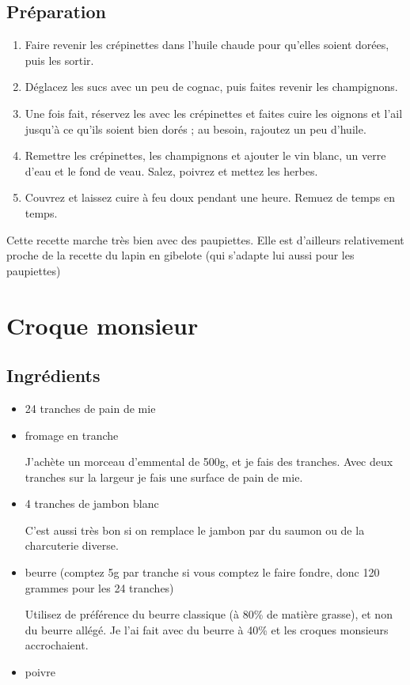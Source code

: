 \subsection*{Préparation}
\begin{enumerate}
\item Faire revenir les crépinettes dans l'huile chaude pour qu'elles soient dorées, puis les sortir.
\item Déglacez les sucs avec un peu de cognac, puis faites revenir les champignons.
\item Une fois fait, réservez les avec les crépinettes et faites cuire les oignons et l'ail jusqu'à ce qu'ils soient bien dorés ; au besoin, rajoutez un peu d'huile.
\item Remettre les crépinettes, les champignons et ajouter le vin blanc, un verre d'eau et le fond de veau. Salez, poivrez et mettez les herbes.
\item Couvrez et laissez cuire à feu doux pendant une heure. Remuez de temps en temps.
\end{enumerate}

\begin{remarque}
Cette recette marche très bien avec des paupiettes. Elle est d'ailleurs relativement proche de la recette du lapin en gibelote (qui s'adapte lui aussi pour les paupiettes)
\end{remarque}

\newpage
\section{Croque monsieur}
\subsection*{Ingrédients}
\begin{itemize}
\item 24 tranches de pain de mie
\item fromage en tranche
\begin{remarque}
J'achète un morceau d'emmental de 500g, et je fais des tranches. Avec deux tranches sur la largeur je fais une surface de pain de mie.
\end{remarque}

\item 4 tranches de jambon blanc
\begin{remarque}
C'est aussi très bon si on remplace le jambon par du saumon ou de la charcuterie diverse.
\end{remarque}

\item beurre (comptez 5g par tranche si vous comptez le faire fondre, donc 120 grammes pour les 24 tranches)
\begin{attention}
Utilisez de préférence du beurre classique (à 80\% de matière grasse), et non du beurre allégé. Je l'ai fait avec du beurre à 40\% et les croques monsieurs accrochaient.
\end{attention}

\item poivre
\end{itemize}

